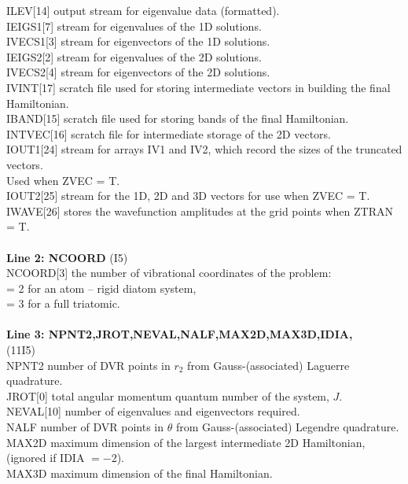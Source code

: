 \documentclass{elsart}
\begin{document}
\begin{tabbing}
ILEV[14] \> output stream for eigenvalue data (formatted).\\
IEIGS1[7] \> stream for eigenvalues of the 1D solutions.\\
IVECS1[3] \> stream for eigenvectors of the 1D solutions.\\
IEIGS2[2] \> stream for eigenvalues of the 2D solutions.\\
IVECS2[4] \> stream for eigenvectors of the 2D solutions.\\
IVINT[17] \> scratch file used for storing intermediate vectors in
building the final Hamiltonian. \\
IBAND[15] \> scratch file used for storing bands of the final Hamiltonian. \\
INTVEC[16]\> scratch file for intermediate storage of the 2D vectors. \\
IOUT1[24] \> stream for arrays IV1 and IV2, which record the sizes of the
 truncated vectors.\\ \> Used when ZVEC = T.\\
IOUT2[25] \> stream for the 1D, 2D and 3D vectors for use
when ZVEC = T.\\
IWAVE[26] \> stores the wavefunction amplitudes at the grid points when
ZTRAN = T. \\
\\
{\bf Line 2: NCOORD} (I5)\\
NCOORD[3] \> the number of vibrational coordinates of the problem:\\
          \> = 2 for an atom -- rigid diatom system, \\
          \> = 3 for a full triatomic.\\
\\
{\bf Line 3: NPNT2,JROT,NEVAL,NALF,MAX2D,MAX3D,IDIA,}\\
(11I5)\\
NPNT2 \> number of DVR points in $r_2$ from Gauss-(associated) Laguerre
quadrature. \\
JROT[0] \> total angular momentum quantum number of the system, $J$.\\
NEVAL[10] \> number of eigenvalues and eigenvectors required.\\
NALF \>number of DVR points in $\theta$ from  Gauss-(associated) Legendre
quadrature.\\
MAX2D\> maximum dimension of the largest intermediate 2D Hamiltonian,\\
      \> (ignored if IDIA $= -2$).\\
MAX3D\> maximum dimension of the final Hamiltonian.\\

\end{tabbing}
\end{document}
